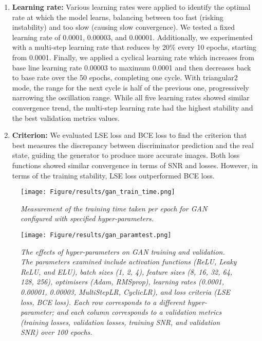 \begin{enumerate}
	\item \textbf{Learning rate:} Various learning rates were applied to identify the optimal rate at which the model learns, balancing between too fast (risking instability) and too slow (causing slow convergence). We tested a fixed learning rate of 0.0001, 0.00003, and 0.00001. Additionally, we experimented with a multi-step learning rate that reduces by 20\% every 10 epochs, starting from 0.0001. Finally, we applied a cyclical learning rate which increases from base line learning rate 0.00003 to maximum 0.0001 and then decreases back to base rate over the 50 epochs, completing one cycle. With triangular2 mode, the range for the next cycle is half of the previous one, progressively narrowing the oscillation range. While all five learning rates showed similar convergence trend, the multi-step learning rate had the highest stability and the best validation metrics values.
	
	\item \textbf{Criterion:} We evaluated LSE loss and BCE loss to find the criterion that best measures the discrepancy between discriminator prediction and the real state, guiding the generator to produce more accurate images. Both loss functions showed similar convergence in terms of SNR and losses. However, in terms of the training stability, LSE loss outperformed BCE loss.
\end{enumerate}

\begin{figure}[h]
	\centering
	\texttt{[image: Figure/results/gan\_train\_time.png]} %
	\caption{\textit{Measurement of the training time taken per epoch for GAN configured with specified hyper-parameters.}}
	\label{fig:gan_time}
\end{figure}

\begin{figure}[h]
	\centering
	\texttt{[image: Figure/results/gan\_paramtest.png]} %
	\caption{\textit{The effects of hyper-parameters on GAN training and validation. The parameters examined include activation functions (ReLU, Leaky ReLU, and ELU), batch sizes (1, 2, 4), feature sizes (8, 16, 32, 64, 128, 256), optimisers (Adam, RMSprop), learning rates (0.0001, 0.00001, 0.00003, MultiStepLR, CyclicLR), and loss criteria (LSE loss, BCE loss). Each row corresponds to a different hyper-parameter; and each column corresponds to a validation metrics (training losses, validation losses, training SNR, and validation SNR) over 100 epochs.}}
	\label{fig:gan_param}
\end{figure}

